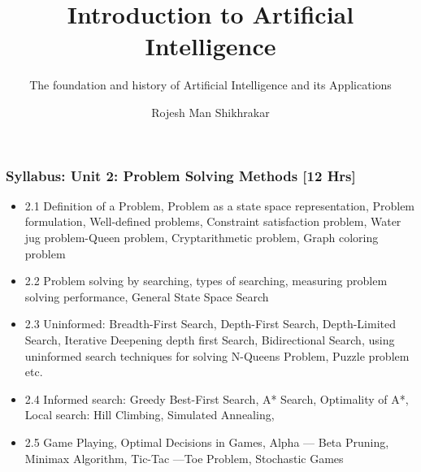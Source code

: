 \documentclass{beamer}
\title{Introduction to Artificial Intelligence}
\subtitle{The foundation and history of Artificial Intelligence and its Applications}
\author[RMS]{Rojesh Man Shikhrakar}
\begin{document}
\maketitle

\begin{frame}
  \frametitle{Syllabus: Unit 2: Problem Solving Methods [12 Hrs]}

  \begin{itemize}
    \item 2.1 Definition of a Problem, Problem as a state space representation, Problem formulation, Well-defined problems, Constraint satisfaction problem, Water jug problem-Queen problem, Cryptarithmetic problem, Graph coloring problem
    \item 2.2 Problem solving by searching, types of searching, measuring problem solving performance, General State Space Search
    \item 2.3 Uninformed: Breadth-First Search, Depth-First Search, Depth-Limited Search, Iterative Deepening depth first Search, Bidirectional Search, using uninformed search techniques for solving N-Queens Problem, Puzzle problem etc.
    \item 2.4 Informed search: Greedy Best-First Search, A* Search, Optimality of A*, Local search: Hill Climbing, Simulated Annealing, 
    \item 2.5 Game Playing, Optimal Decisions in Games, Alpha — Beta Pruning, Minimax Algorithm, Tic-Tac —Toe Problem, Stochastic Games
  \end{itemize}
\end{frame}
\end{document}
